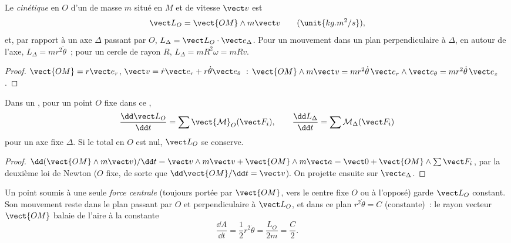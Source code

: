 \begin{definition}\label{def:b1:angular-momentum:L}
Le \emph{ cinétique} en $O$ d'un  de masse $m$ situé
en $M$ et de vitesse $\vect v$ est
\[
\vect L_O = \vect{OM}\wedge m\vect v \qquad (\unit{kg.m^2/s}),
\]
et, par rapport à un axe $\Delta$ passant par $O$, $L_\Delta = \vect L_O\cdot\vect e_\Delta$.
Pour un mouvement dans un plan perpendiculaire à $\Delta$, en
 autour de l'axe, $L_\Delta = mr^2\dot\theta$~; pour
un cercle de rayon $R$, $L_\Delta = mR^2\omega = mRv$.
\end{definition}

\begin{proof}
$\vect{OM} = r\vect e_r$, $\vect v = \dot r\vect e_r + r\dot\theta\vect e_\theta$~:
$\vect{OM}\wedge m\vect v = mr^2\dot\theta\,\vect e_r\wedge\vect e_\theta = mr^2\dot\theta\,\vect e_z$.
\end{proof}

\begin{theorem}\label{thm:b1:angular-momentum:theorem}
Dans un , pour un point $O$ fixe dans ce ,
\[
\frac{\dd\vect L_O}{\dd t} = \sum\vect{\mathcal M}_O(\vect F_i),
\qquad
\frac{\dd L_\Delta}{\dd t} = \sum\mathcal M_\Delta(\vect F_i)
\]
pour un axe fixe $\Delta$. Si le  total en $O$ est nul,
$\vect L_O$ se conserve.
\end{theorem}

\begin{proof}
$\dd(\vect{OM}\wedge m\vect v)/\dd t = \vect v\wedge m\vect v + \vect{OM}\wedge m\vect a
= \vect 0 + \vect{OM}\wedge\sum\vect F_i$, par la deuxième loi de Newton
($O$ fixe, de sorte que $\dd\vect{OM}/\dd t = \vect v$). On projette ensuite sur $\vect e_\Delta$.
\end{proof}

\begin{corollary}\label{cor:b1:angular-momentum:central}
Un point soumis à une seule \emph{force centrale} (toujours portée par
$\vect{OM}$, vers le centre fixe $O$ ou à l'opposé) garde $\vect L_O$
constant. Son mouvement reste dans le plan passant par $O$ et
perpendiculaire à $\vect L_O$, et dans ce plan $r^2\dot\theta = C$
(constante)~: le rayon vecteur $\vect{OM}$ balaie de l'aire à la
\emph{} constante
\[
\frac{\dd A}{\dd t} = \frac12 r^2\dot\theta = \frac{L_O}{2m} = \frac{C}{2} .
\]
\end{corollary}

